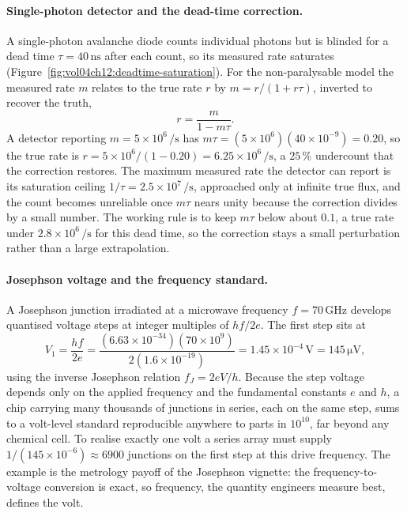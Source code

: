 \paragraph{Single-photon detector and the dead-time correction.}
A single-photon avalanche diode counts individual photons but is blinded
for a dead time $\tau = 40\,\si{\nano\second}$ after each count, so its
measured rate saturates (Figure~\ref{fig:vol04ch12:deadtime-saturation}).
For the non-paralysable model the measured rate $m$ relates to the true rate
$r$ by $m = r/(1 + r\tau)$, inverted to recover the truth,
\[
r = \frac{m}{1 - m\tau}.
\]
A detector reporting $m = 5\times 10^{6}\,\si{\per\second}$ has $m\tau =
(5\times 10^{6})(40\times 10^{-9}) = 0.20$, so the true rate is $r =
5\times 10^{6}/(1 - 0.20) = 6.25\times 10^{6}\,\si{\per\second}$, a $25\,\%$
undercount that the correction restores. The maximum measured rate the
detector can report is its saturation ceiling $1/\tau = 2.5\times 10^{7}\,
\si{\per\second}$, approached only at infinite true flux, and the count
becomes unreliable once $m\tau$ nears unity because the correction divides
by a small number. The working rule is to keep $m\tau$ below about $0.1$, a
true rate under $2.8\times 10^{6}\,\si{\per\second}$ for this dead time, so
the correction stays a small perturbation rather than a large extrapolation.

\paragraph{Josephson voltage and the frequency standard.}
A Josephson junction irradiated at a microwave frequency $f = 70\,\si{\giga
\hertz}$ develops quantised voltage steps at integer multiples of $hf/2e$.
The first step sits at
\[
V_1 = \frac{hf}{2e}
    = \frac{(6.63\times 10^{-34})(70\times 10^{9})}{2(1.6\times 10^{-19})}
    = 1.45\times 10^{-4}\,\si{\volt}
    = 145\,\si{\micro\volt},
\]
using the inverse Josephson relation $f_J = 2eV/h$. Because the step voltage
depends only on the applied frequency and the fundamental constants $e$ and
$h$, a chip carrying many thousands of junctions in series, each on the
same step, sums to a volt-level standard reproducible anywhere to parts in
$10^{10}$, far beyond any chemical cell. To realise exactly one volt a
series array must supply $1/(145\times 10^{-6}) \approx 6900$ junctions on
the first step at this drive frequency. The example is the metrology payoff
of the Josephson vignette: the frequency-to-voltage conversion is exact, so
frequency, the quantity engineers measure best, defines the volt.

